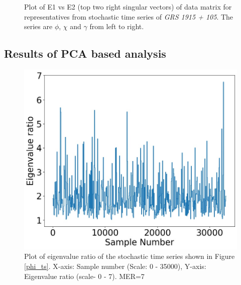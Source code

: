 \documentclass[10pt,conference]{IEEEtran}
\begin{document}
\begin{figure}
 \centering
\caption{Plot of E1 vs E2 (top two right singular vectors) of data matrix for  representatives from  stochastic time series  of \textit{GRS 1915 + 105}. The series are $\phi$, $\chi$ and $\gamma$ from left to right.}
 \label{svd_e1e2_stochastic}
\end{figure}


\subsection{Results of PCA based analysis}

\begin{figure}[ht]
\centering
\includegraphics[width=0.8\linewidth]{sac_ascf_phi_eig.jpg}
\caption{Plot of eigenvalue ratio of the stochastic time series shown in Figure \ref{phi_ts}. X-axis: Sample number (Scale: 0 - 35000), Y-axis: Eigenvalue ratio (scale- 0 - 7). MER=7}
\label{phi_eig}
\end{figure}
\end{document}
